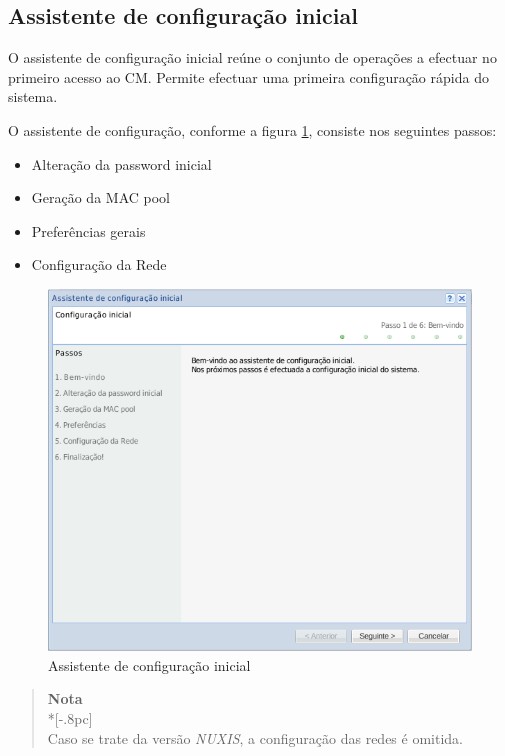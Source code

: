\subsection{Assistente de configuração inicial}
O assistente de configuração inicial reúne o conjunto de operações a efectuar no primeiro acesso ao CM. Permite efectuar uma primeira configuração rápida do sistema.

O assistente de configuração, conforme a figura \ref{fig:first_time_wizard}, consiste nos seguintes passos:
\begin{itemize}
	\item Alteração da password inicial
	\item Geração da MAC pool
    \item Preferências gerais
	\item Configuração da Rede
\end{itemize}

\begin{figure}[H]
        \begin{center}
        \includegraphics[scale=0.7]{screenshots/first_time_wizard.png}
        \caption{Assistente de configuração inicial}
        \label{fig:first_time_wizard}
        \end{center}
\end{figure}

\begin{quote}
	{\large \bf Nota} \\*[-.8pc]
	\underline{\hspace{6in}} \\
	Caso se trate da versão \emph{NUXIS}, a configuração das redes é omitida.
\end{quote}

